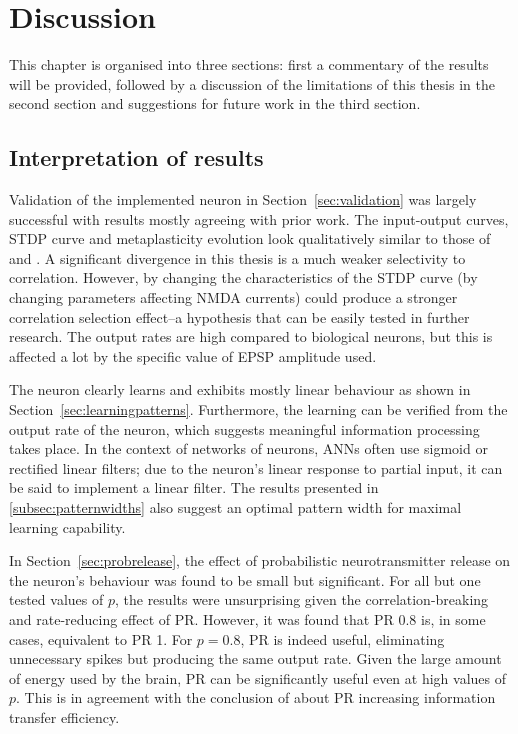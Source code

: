 \documentclass[a4paper,12pt]{report}
\theoremstyle{definition}
\begin{document}
\chapter{Discussion}

This chapter is organised into three sections: first a commentary of the results will be provided, followed by a discussion of the limitations of this thesis in the second section and suggestions for future work in the third section.

\section{Interpretation of results}

Validation of the implemented neuron in Section~\ref{sec:validation} was largely successful with results mostly agreeing with prior work. The input-output curves, STDP curve and metaplasticity evolution look qualitatively similar to those of \cite{shouval2002unified} and \cite{yeung2004synaptic}. A significant divergence in this thesis is a much weaker selectivity to correlation. However, by changing the characteristics of the STDP curve (by changing parameters affecting NMDA currents) could produce a stronger correlation selection effect--a hypothesis that can be easily tested in further research. The output rates are high compared to biological neurons, but this is affected a lot by the specific value of EPSP amplitude used.


The neuron clearly learns and exhibits mostly linear behaviour as shown in Section~\ref{sec:learningpatterns}. Furthermore, the learning can be verified from the output rate of the neuron, which suggests meaningful information processing takes place.
In the context of networks of neurons, ANNs often use sigmoid or rectified linear filters; due to the neuron's linear response to partial input, it can be said to implement a linear filter. The results presented in \ref{subsec:patternwidths} also suggest an optimal pattern width for maximal learning capability.


In Section~\ref{sec:probrelease}, the effect of probabilistic neurotransmitter release on the neuron's behaviour was found to be small but significant. For all but one tested values of $p$, the results were unsurprising given the correlation-breaking and rate-reducing effect of PR. However, it was found that PR 0.8 is, in some cases, equivalent to PR 1. For $p=0.8$, PR is indeed useful, eliminating unnecessary spikes but producing the same output rate. Given the large amount of energy used by the brain, PR can be significantly useful even at high values of $p$. This is in agreement with the conclusion of \cite{goldman2004enhancement} about PR increasing information transfer efficiency.
\end{document}
